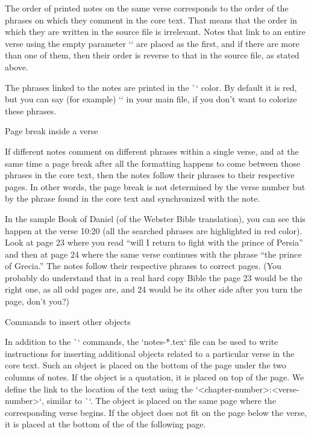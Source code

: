 The order of printed notes on the same verse corresponds to the order of the phrases on which
they comment in the core text. That means that the order in which they are written 
in the source file is irrelevant. Notes that link to an entire verse using the empty parameter `{}`  are placed as the first, and if there are more than one of them, then their order is reverse to that in the source file, as stated above.

The phrases linked to the notes are printed in the \`\notecolor` color. By default it is red, but you can say (for example) `\let\notecolor=\relax` in your main file, if you don't want to colorize these phrases.


 Page break inside a verse  

If different notes comment on different phrases within a single verse, and at the same time a page break after all the formatting happens to come between those phrases in the core text, then the notes follow their phrases to their respective pages. In other words, the page break is not determined by the verse number but by the phrase found  in the core text and synchronized with the note. 

In the sample Book of Daniel (of the Webster Bible translation), you can see this happen at the verse 10:20 
(all the searched phrases are highlighted in red color). Look at page 23
where you read “will I return to fight with the prince of Persia” and then at page 24 where the same verse continues with the phrase “the prince of Grecia.” The notes follow their respective phrases to correct pages. 
(You probably do understand that in a real hard copy Bible the page 23 would be the right one, as all odd pages are, and 24 would be its other side after you turn the page, don't you?)

\filbreak
\bigskip
\picw=200pt


\secc[articles] Commands to insert other objects

In addition to the \`\Note` commands, the `notes-*.tex` file can be used to write instructions for 
inserting additional objects related to a particular verse in the core text. Such an object is 
placed on the bottom of the page under the two columns of notes. If the object is a quotation, it is placed on
top of the page. We define the link to the location of the text using the 
`<chapter-number>:<verse-number>`, similar to \`\Note`. The object is placed on the same page where 
the corresponding verse begins.
If the object does not fit on the page below the verse, it is placed at the bottom of the
of the following page.

